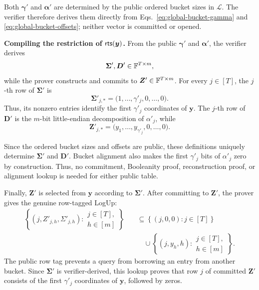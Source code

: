 Both $\bm\gamma'$ and $\bm\alpha'$ are determined by the public ordered
bucket sizes in $\mathcal L$.  The verifier therefore derives them directly
from Eqs.~\eqref{eq:global-bucket-gamma} and
\eqref{eq:global-bucket-offsets}; neither vector is committed or opened.

\mysmallskip\noindent
\textbf{Compiling the restriction of ${\sf rts}(\bm y)$.}
From the public $\bm\gamma'$ and $\bm\alpha'$, the verifier derives
\[
    \bm\Sigma',\bm D'
    \in{\mathbb{F}}^{T\times m},
\]
while the prover constructs and commits to
$\bm Z'\in{\mathbb{F}}^{T\times m}$.  For every $j\in[T]$, the $j$-th row of
$\bm\Sigma'$ is
\begin{equation}
\label{eq:Sigma-prime-row}
    \bm\Sigma'_{j,*}
    =
    \bigl(
        1,\ldots,\gamma'_j,
        0,\ldots,0
    \bigr).
\end{equation}
Thus, its nonzero entries identify the first $\gamma'_j$ coordinates of
$\bm y$.  The $j$-th row of $\bm D'$ is the $m$-bit little-endian
decomposition of $\alpha'_j$, while
\begin{equation}
\label{eq:Z-prime-row}
    \bm Z'_{j,*}
    =
    \bigl(
        y_1,\ldots,y_{\gamma'_j},
        0,\ldots,0
    \bigr).
\end{equation}

Since the ordered bucket sizes and offsets are public, these definitions
uniquely determine $\bm\Sigma'$ and $\bm D'$.  Bucket alignment also makes
the first $\gamma'_j$ bits of $\alpha'_j$ zero by construction.  Thus, no
commitment, Booleanity proof, reconstruction proof, or alignment lookup is
needed for either public table.

Finally, $\bm Z'$ is selected from $\bm y$ according to $\bm\Sigma'$.
After committing to $\bm Z'$, the prover gives the genuine row-tagged LogUp:
\begin{equation}
\label{eq:Z-prime-lookup}
\begin{aligned}
\left\{
(j,Z'_{j,h},\Sigma'_{j,h})
:
\substack{j\in[T],\\h\in[m]}
\right\}
&\quad\subseteq
\left\{(j,0,0):j\in[T]\right\}\\
&\qquad\cup
\left\{
(j,y_h,h)
:
\substack{j\in[T],\\h\in[m]}
\right\}.
\end{aligned}
\end{equation}
The public row tag prevents a query from borrowing an entry from another
bucket.  Since $\bm\Sigma'$ is verifier-derived, this lookup proves that row
$j$ of committed $\bm Z'$ consists of the first $\gamma'_j$ coordinates of
$\bm y$, followed by zeros.

